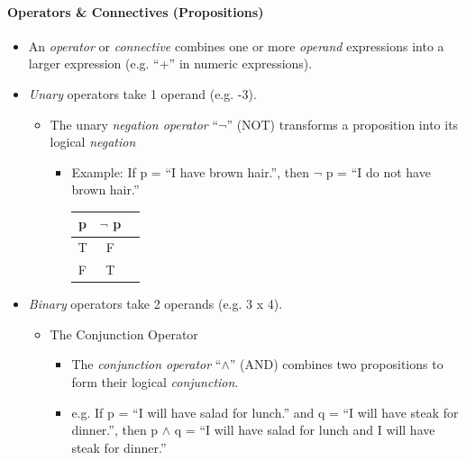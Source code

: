 \documentclass[english, 11pt]{article}
\begin{document}
\begin{addmargin}[2em]{2em}
\begin{addmargin}[1em]{2em}
          \paragraph{Operators \& Connectives (Propositions)}
          \begin{itemize}
            \item An \textit{operator} or \textit{connective} combines one or
            more \textit{operand} expressions into a larger expression
            (e.g. ``+'' in numeric expressions).
            \item \textit{Unary} operators take 1 operand (e.g. -3).
              \begin{itemize}
                \item The unary \textit{negation operator} ``\( \neg \)''
                (NOT) transforms a proposition into its logical \textit{negation}
                \begin{itemize}
                  \item Example: If p = ``I have brown hair.'', then
                  \( \neg \) p = ``I do not have brown hair.''
                    \begin{tabular}{c|cc}
                      p & $\neg$ p \\
                      \hline
                      T & F \\
                      F & T
                    \end{tabular}
                \end{itemize}
              \end{itemize}
            \item \textit{Binary} operators take 2 operands (e.g. 3 x 4).
              \begin{itemize}
                \item The Conjunction Operator
                  \begin{itemize}
                    \item The \textit{conjunction operator} ``$\wedge$'' (AND)
                    combines two propositions to form their logical \textit{conjunction}.
                    \item e.g. If p = ``I will have salad for lunch.'' and
                    q = ``I will have steak for dinner.'', then p $\wedge$ q =
                    ``I will have salad for lunch and I will have steak for dinner.''
                    \\
                    \\

\end{itemize}
\end{itemize}
\end{itemize}
\end{addmargin}
\end{addmargin}
\end{document}
